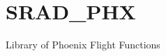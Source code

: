 \chapter{SRAD\+\_\+\+PHX}
\hypertarget{md_README}{}\label{md_README}
\label{md_README_autotoc_md0}%
%


Library of Phoenix Flight Functions 